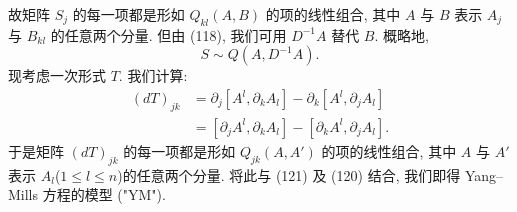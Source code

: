 故矩阵 $S_j$ 的每一项都是形如 $Q_{kl}(A,B)$ 的项的线性组合, 其中 $A$ 与 $B$ 表示 $A_j$ 与 $B_{kl}$ 的任意两个分量. 但由 (118), 我们可用 $D^{-1}A$ 替代 $B$. 概略地,
\begin{equation}
S\sim Q(A,D^{-1}A).\end{equation}
现考虑一次形式 $T$. 我们计算:
\begin{align*}
(dT)_{jk}&=\partial_j[A^l,\partial_k A_l]-\partial_k[A^l,\partial_j A_l]\\
&=[\partial_j A^l,\partial_k A_l]-[\partial_k A^l,\partial_j A_l].\end{align*}
于是矩阵 $(dT)_{jk}$ 的每一项都是形如 $Q_{jk}(A,A')$ 的项的线性组合, 其中 $A$ 与 $A'$ 表示 $A_l$($1\leq l\leq n$)的任意两个分量. 将此与 (121) 及 (120) 结合, 我们即得 Yang--Mills 方程的模型 ("YM").
